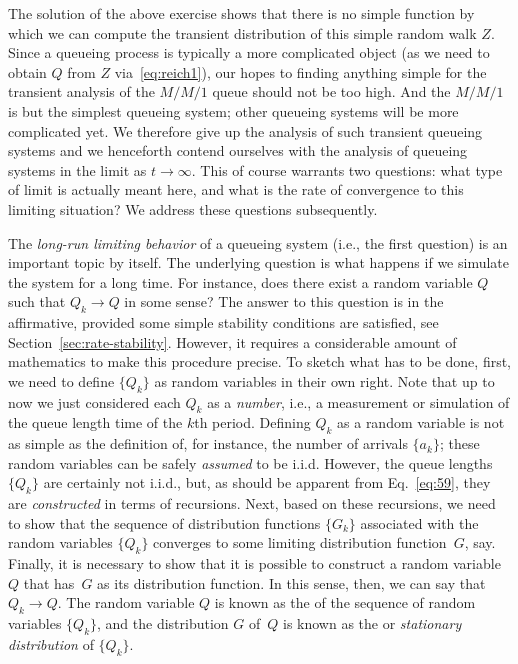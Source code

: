 The solution of the above exercise shows that there is no simple
function by which we can compute the transient distribution of 
this simple random walk $Z$. Since a queueing process is typically a
more complicated object (as we need to obtain $Q$ from $Z$ via~\eqref{eq:reich1}), our
hopes to finding anything simple for the transient analysis of the
$M/M/1$ queue should not be too high. And the $M/M/1$ is but the
simplest queueing system; other queueing systems will be more
complicated yet.  We therefore give up the analysis of such transient
queueing systems and we henceforth contend ourselves with the analysis
of queueing systems in the limit as $t\to\infty$.  This of course
warrants two questions: what type of limit is actually meant here, and
what is the rate of convergence to this limiting situation? We address
these questions subsequently.

The \emph{long-run limiting behavior} of a queueing system (i.e., the first question) is an
important topic by itself. The underlying question is what happens if
we simulate the system for a long time. For instance, does there exist
a random variable $Q$ such that $Q_k\to Q$ in some sense? The answer
to this question is in the affirmative, provided some simple stability
conditions are satisfied, see
Section~\ref{sec:rate-stability}. However, it requires a considerable
amount of mathematics to make this procedure precise. To sketch what
has to be done, first, we need to define $\{Q_k\}$ as random variables
in their own right. Note that up to now we just considered each $Q_k$
as a \emph{number}, i.e., a measurement or simulation of the queue
length time of the $k$th period. Defining $Q_k$ as a random variable
is not as simple as the definition of, for instance, the number of
arrivals $\{a_k\}$; these random variables can be safely
\emph{assumed} to be i.i.d. However, the queue lengths $\{Q_k\}$ are
certainly not i.i.d., but, as should be apparent from
Eq.~\eqref{eq:59}, they are \emph{constructed} in terms of
recursions. Next, based on these recursions, we need to show that the
sequence of distribution functions $\{G_k\}$ associated with the
random variables $\{Q_k\}$ converges to some limiting distribution
function~$G$, say. Finally, it is necessary to show that it is
possible to construct a random variable~$Q$ that has~$G$ as its
distribution function.  In this sense, then, we can say
that~$Q_k \to Q$. The random variable $Q$ is known as the
 of the sequence of random variables
$\{Q_k\}$, and the distribution $G$ of~$Q$ is known as the
 or \emph{stationary distribution} of $\{Q_k\}$.


